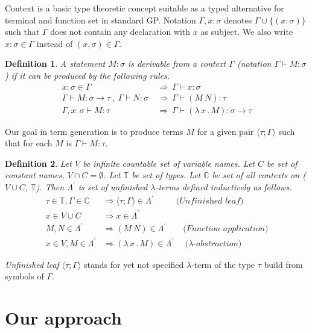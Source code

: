 \documentclass[conference]{IEEEtran}
\newtheorem{definition}{Definition}
\newcommand{\lterm}{$\lambda$-term\xspace}
\newcommand{\lterms}{$\lambda$-terms\xspace}
\newcommand{\tur}[3]{#1\vdash{}#2 \colon #3}
\newcommand{\then}{\Rightarrow\xspace}
\newcommand{\lamb}[2]{( \lambda \, #1 \, . \, #2 )}
\newcommand{\ar}{\rightarrow\xspace}
\newcommand{\T}{\mathbb{T}\xspace}
\newcommand{\C}{\mathbb{C}\xspace}
\newcommand{\Lpr}{\Lambda^\prime}
\newcommand{\ul}[2]{\langle #1 ; #2 \rangle}
\begin{document}
Context is a basic type theoretic concept suitable as a typed alternative
for terminal and function set in standard GP. 
Notation $\Gamma,x:\sigma $ denotes $ \Gamma\cup\{(x:\sigma)\}$ 
such that $\Gamma$ does not contain any declaration with $x$ as subject.
We also write $x:\sigma \in \Gamma$ instead of $(x,\sigma) \in \Gamma$.

\begin{definition}
A statement $M\colon\sigma$ is \textit{derivable from}
a context $\Gamma$ (notation 
\mbox{$\Gamma\vdash{}M\colon\sigma$}) 
if it can be produced by the following rules.
\begin{align*}
x : \sigma \in \Gamma &~\then~ \tur{\Gamma}{x}{\sigma}\\
\tur{\Gamma}{M}{\sigma \ar \tau}~,~\tur{\Gamma}{N}{\sigma} 
&~\then~ \tur{\Gamma}{(M~N)}{\tau}\\  
\tur{\Gamma,x:\sigma}{M}{\tau}
&~\then~ \tur{\Gamma}{\lamb{x}{M}}{\sigma \ar \tau} 
\end{align*}
\end{definition}

Our goal in term generation is to produce terms $M$
for a given pair $\ul{\tau}{\Gamma}$
such that for each $M$ is $\tur{\Gamma}{M}{\tau}$.


\begin{definition}
Let $V$ be infinite countable set of {\it 
variable names}. Let $C$ be set of {\it constant names}, 
$V \cap C = \emptyset$.	
Let $\T$ be set of types.
Let $\C$ be set of all contexts on ($V \cup C$, $\T$).
Then $\Lpr$ is set of 
\textit{unfinished  \lterms} defined inductively as follows.	
\begin{align*}
\tau \in \T , \Gamma \in \C &\then \ul{\tau}{\Gamma} \in \Lpr
\textit{~~~~~~~~(Unfinished leaf)}\\
x   \in V \cup C  &\then x     \in \Lpr \\
M,N \in \Lpr   &\then (M~N) \in \Lpr 
\textit{~~~~~~(Function application)} \\
x   \in V , M \in \Lpr &\then \lamb{x}{M} \in \Lpr
\textit{~~~~($\lambda$-abstraction)} 
\end{align*}
\end{definition}

\textit{Unfinished leaf} $\ul{\tau}{\Gamma}$ 
stands for yet not specified \lterm of the type $\tau$ 
build from symbols of $\Gamma$.



\section{Our approach}
\label{approach}
\end{document}
